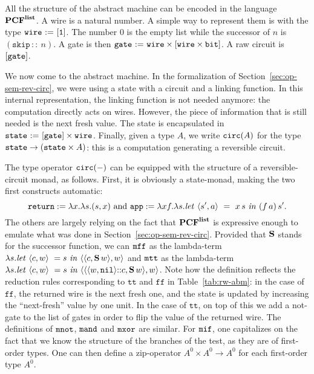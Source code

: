 \documentclass{article}
\theoremstyle{plain}
\theoremstyle{definition}
\newcommand{\PCF}{\mbox{${\bf PCF}^{\bf list}$}}
\newcommand{\bit}{{\tt bit}}
\newcommand{\listtype}[1]{{[}{#1}{]}}
\newcommand{\unittype}{{\tt 1}}
\newcommand{\tunit}{\unittype}
\newcommand{\punit}{\mathtt{skip}}\newcommand{\prodterm}[1]{{\langle{#1}\rangle}}
\newcommand{\letprodterm}[3]{{{\it let}~\prodterm{#1}~=~{#2}~{\it in}~{#3}}}
\newcommand{\ttrue}{\mathtt{t\!t}}
\newcommand{\ffalse}{\mathtt{f\!f}}
\newcommand{\nil}{{\mathtt{nil}}}
\newcommand{\cons}[3][]{{{#2}\,{\mathtt :}{\mathtt :}^{#1}\,{#3}}}
\newcommand{\monadreturn}{{\tt return}}
\newcommand{\monadapp}{{\tt app}}
\newcommand{\wiretype}{{\tt wire}}
\newcommand{\monadttrue}{{\tt mtt}}
\newcommand{\monadffalse}{{\tt mff}}
\newcommand{\monadif}{{\tt mif}}
\newcommand{\monadand}{{\tt mand}}
\newcommand{\monadxor}{{\tt mxor}}
\newcommand{\monadnot}{{\tt mnot}}
\newcommand{\gatetype}{{\tt gate}}
\newcommand{\statetype}{{\tt state}}
\newcommand{\circtype}{{\tt circ}}
\newcommand{\succterm}{{\bf S}}
\begin{document}
All the structure of the abstract machine can be encoded in
the language \PCF{}.
A wire is a natural number. A simple way to represent them
is with the type $\wiretype ~{:}{=}~ \listtype{\tunit}$. The number
$0$ is the empty list while the successor of $n$ is
$(\cons{\punit}{n})$.
A gate is then $\gatetype ~{:}{=}~
\wiretype\times\listtype{\wiretype\times\bit}$.
A raw circuit is  $\listtype{\gatetype}$.

We now come to the abstract machine. In the formalization of
Section~\ref{sec:op-sem-rev-circ}, we were using a state with a circuit and a
linking function. In this internal representation, the linking
function is not needed anymore: the computation directly acts on
wires. However, the piece of information that is still needed is the
next fresh value. The state is encapsulated in $\statetype ~{:}{=}~
\listtype{\gatetype}\times\wiretype$.
Finally, given a type $A$, we write $\circtype(A)$ for the type
$\statetype \to (\statetype\times A)$: this is a computation
generating a reversible circuit.

The type operator $\circtype(-)$ can be equipped with the structure of
a reversible-circuit monad, as follows. First, it is obviously a
state-monad, making the two first constructs automatic:
\[
\monadreturn :=
  \lambda x.\lambda s.(s,x)
\textrm{ and }
  \monadapp
  :=
  \lambda xf.\lambda s.\letprodterm{s',a}{x\,s}{(f\,a)\,s'}.
\]
The others are largely relying on the fact that \PCF{} is expressive
enough to emulate what was done in Section~\ref{sec:op-sem-rev-circ}.
Provided that $\succterm$ stands for the successor function, we can
$\monadffalse$ as the lambda-term
$\lambda
      s.\letprodterm{c,w}{\!\!s}{\prodterm{\prodterm{c,\succterm\,w},w}}$
and $\monadttrue$ as  the lambda-term
$\lambda
      s.\letprodterm{c,w}{\!\!s}{\prodterm{\prodterm{\prodterm{w, \nil} {:}{:} c,\succterm\,w},w}}
$.
Note how the definition reflects the reduction rules corresponding to
$\ttrue$ and $\ffalse$ in Table~\ref{tab:rw-abm}: in the case of
$\ffalse$, the returned wire is the next fresh one, and the state is
updated by increasing the ``next-fresh'' value by one unit. In the
case of $\ttrue$, on top of this we add a not-gate to the list of
gates in order to flip the value of the returned wire.
The definitions of $\monadnot$, $\monadand$ and $\monadxor$ are
similar. For $\monadif$, one capitalizes on the fact that we know the
structure of the branches of the test, as they are of first-order
types. One can then define a zip-operator $A^0\times A^0\to A^0$ for
each first-order type $A^0$.
\end{document}
